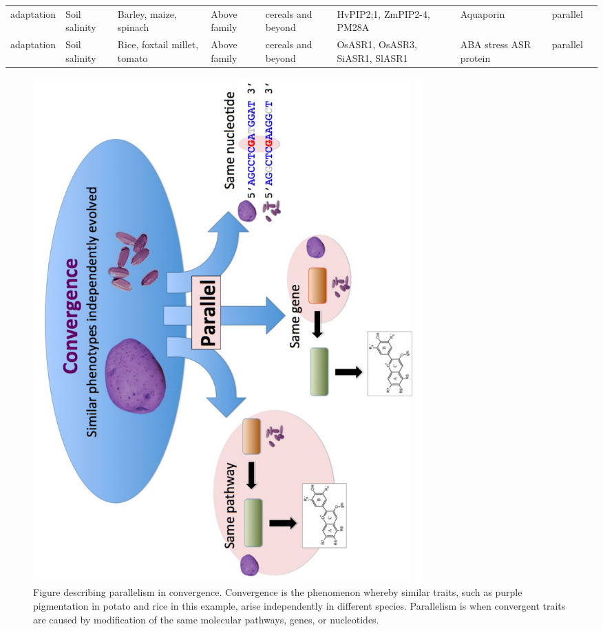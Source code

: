 \documentclass[12pt]{article}
\begin{document}
\begin{table}
\begin{center}
\begin{tabular}{C{1.5cm}G{2.5cm}C{3.10cm}C{3.2cm}C{2.3cm}G{3.5cm}G{2.1cm}C{1.3cm}G{1.5cm}}
 adaptation & Soil salinity &Barley, maize, spinach & Above family & cereals and beyond & HvPIP2;1, ZmPIP2-4, PM28A & Aquaporin & parallel & \citep{Katsuhara2002, Zhu2005, Fotiadis2000}\\
 adaptation & Soil salinity &Rice, foxtail millet, tomato & Above family & cereals and beyond & OsASR1, OsASR3, SiASR1, SlASR1 & ABA stress ASR protein & parallel & \citep{Li2017, Konrad2008}\\
\end{tabular}
\end{center}
\end{table}

\begin{figure}[h]
    \centering
    \includegraphics[width=15cm]{convergence_fig.pdf}
    \caption{Figure describing parallelism in convergence. Convergence is the phenomenon whereby similar traits, such as purple pigmentation in potato and rice in this example, arise independently in different species. Parallelism is when convergent traits are caused by modification of the same molecular pathways, genes, or nucleotides.
}
    \label{fig:convergence}
\end{figure}
\end{document}
